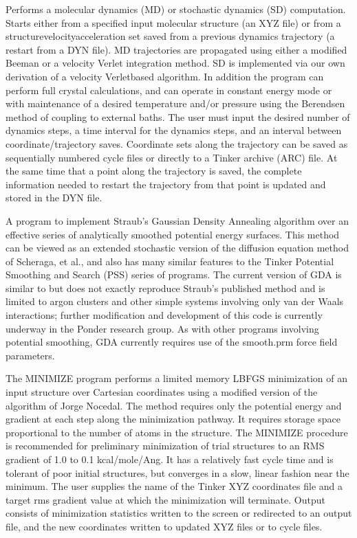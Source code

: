 \documentclass[letterpaper,11pt,english]{sphinxmanual}
\begin{document}

Performs a molecular dynamics (MD) or stochastic dynamics (SD) computation. Starts either from a specified input molecular structure (an XYZ file) or from a structure\sphinxhyphen{}velocity\sphinxhyphen{}acceleration set saved from a previous dynamics trajectory (a restart from a DYN file). MD trajectories are propagated using either a modified Beeman or a velocity Verlet integration method. SD is implemented via our own derivation of a velocity Verlet\sphinxhyphen{}based algorithm. In addition the program can perform full crystal calculations, and can operate in constant energy mode or with maintenance of a desired temperature and/or pressure using the Berendsen method of coupling to external baths. The user must input the desired number of dynamics steps, a time interval for the dynamics steps, and an interval between coordinate/trajectory saves. Coordinate sets along the trajectory can be saved as sequentially numbered cycle files or directly to a Tinker archive (ARC) file. At the same time that a point along the trajectory is saved, the complete information needed to restart the trajectory from that point is updated and stored in the DYN file.


A program to implement Straub’s Gaussian Density Annealing algorithm over an effective series of analytically smoothed potential energy surfaces. This method can be viewed as an extended stochastic version of the diffusion equation method of Scheraga, et al., and also has many similar features to the Tinker Potential Smoothing and Search (PSS) series of programs. The current version of GDA is similar to but does not exactly reproduce Straub’s published method and is limited to argon clusters and other simple systems involving only van der Waals interactions; further modification and development of this code is currently underway in the Ponder research group. As with other programs involving potential smoothing, GDA currently requires use of the smooth.prm force field parameters.


The MINIMIZE program performs a limited memory L\sphinxhyphen{}BFGS minimization of an input structure over Cartesian coordinates using a modified version of the algorithm of Jorge Nocedal. The method requires only the potential energy and gradient at each step along the minimization pathway. It requires storage space proportional to the number of atoms in the structure. The MINIMIZE procedure is recommended for preliminary minimization of trial structures to an RMS gradient of 1.0 to 0.1 kcal/mole/Ang. It has a relatively fast cycle time and is tolerant of poor initial structures, but converges in a slow, linear fashion near the minimum. The user supplies the name of the Tinker XYZ coordinates file and a target rms gradient value at which the minimization will terminate. Output consists of minimization statistics written to the screen or redirected to an output file, and the new coordinates written to updated XYZ files or to cycle files.
\end{document}
